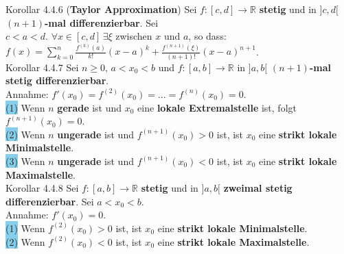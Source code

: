 \documentclass[10pt]{article}
\begin{document}
\colorbox{BurntOrange}{Korollar 4.4.6} (\textbf{Taylor Approximation}) Sei
                \textcolor{NavyBlue}{$f:[c,d]\longrightarrow\mathbb{R}$} \textbf{stetig} und in 
                \textcolor{NavyBlue}{$]c,d[$} \textbf{$(n+1)$-mal differenzierbar}. Sei \\
        \indent \textcolor{NavyBlue}{$c<a<d$}. 
                \textcolor{NavyBlue}{$\forall x\in[c,d]\,\exists\xi$} zwischen 
                \textcolor{NavyBlue}{$x$} und \textcolor{NavyBlue}{$a$}, so dass: 
                \textcolor{NavyBlue}{$f(x)=\sum_{k=0}^n\frac{f^{(k)}(a)}{k!}(x-a)^k
                +\frac{f^{(n+1)}(\xi)}{(n+1)!}(x-a)^{n+1}$}.\\
\colorbox{BurntOrange}{Korollar 4.4.7} Sei \textcolor{NavyBlue}{$n\geqslant0,\,a<x_0<b$} und 
                \textcolor{NavyBlue}{$f:[a,b]\longrightarrow\mathbb{R}$} 
                in \textcolor{NavyBlue}{$]a,b[$} \textbf{$(n+1)$-mal stetig differenzierbar}.\\
        \indent Annahme: \textcolor{NavyBlue}{$f'(x_0)=f^{(2)}(x_0)=...=f^{(n)}(x_0)=0$}. \\
        \indent \colorbox{SkyBlue}{(1)} Wenn \textcolor{NavyBlue}{$n$} \textbf{gerade} 
                ist und \textcolor{NavyBlue}{$x_0$} eine 
                \textbf{lokale Extremalstelle} ist, folgt
                \textcolor{NavyBlue}{ $f^{(n+1)}(x_0)=0$}. \\
        \indent \colorbox{SkyBlue}{(2)} Wenn \textcolor{NavyBlue}{$n$} \textbf{ungerade}
                ist und 
                \textcolor{NavyBlue}{$f^{(n+1)}(x_0)>0$} ist, ist \textcolor{NavyBlue}{$x_0$} 
                eine \textbf{strikt lokale Minimalstelle}. \\
        \indent \colorbox{SkyBlue}{(3)} Wenn \textcolor{NavyBlue}{$n$} \textbf{ungerade} 
                ist und \textcolor{NavyBlue}{$f^{(n+1)}(x_0)<0$} ist, ist 
                \textcolor{NavyBlue}{$x_0$} eine 
                \textbf{strikt lokale Maximalstelle}. \\
\colorbox{BurntOrange}{Korollar 4.4.8} Sei 
                \textcolor{NavyBlue}{$f:[a,b]\longrightarrow\mathbb{R}$} 
                \textbf{stetig} und in \textcolor{NavyBlue}{$]a,b[$}
                \textbf{zweimal stetig differenzierbar}. Sei \textcolor{NavyBlue}{$a<x_0<b$}. \\
        \indent Annahme: \textcolor{NavyBlue}{$f'(x_0)=0$}.\\
        \indent \colorbox{SkyBlue}{(1)} Wenn \textcolor{NavyBlue}{$f^{(2)}(x_0)>0$} ist, ist 
                \textcolor{NavyBlue}{$x_0$}
                eine \textbf{strikt lokale Minimalstelle}. \\
        \indent \colorbox{SkyBlue}{(2)} Wenn \textcolor{NavyBlue}{$f^{(2)}(x_0)<0$} ist, ist
                \textcolor{NavyBlue}{$x_0$}
                eine \textbf{strikt lokale Maximalstelle}.
\end{document}
